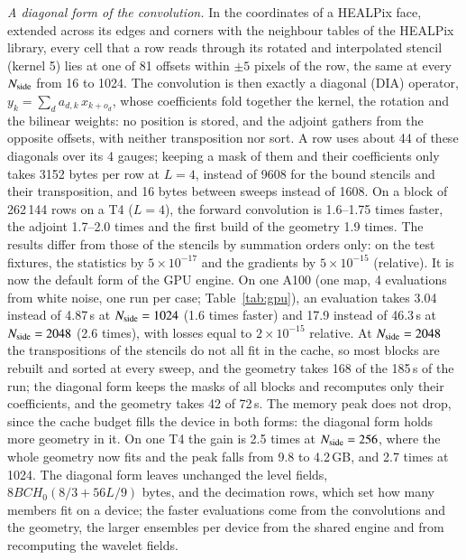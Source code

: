 \documentclass{aa}
\newcommand{\nside}{N_{\rm side}}
\begin{document}
\emph{A diagonal form of the convolution.} In the coordinates of a HEALPix face, extended across its edges and corners with the neighbour tables of the HEALPix library, every cell that a row reads through its rotated and interpolated stencil (kernel 5) lies at one of 81 offsets within $\pm5$ pixels of the row, the same at every $\nside$ from 16 to 1024. The convolution is then exactly a diagonal (DIA) operator, $y_k=\sum_d a_{d,k}\,x_{k+o_d}$, whose coefficients fold together the kernel, the rotation and the bilinear weights: no position is stored, and the adjoint gathers from the opposite offsets, with neither transposition nor sort. A row uses about 44 of these diagonals over its 4 gauges; keeping a mask of them and their coefficients only takes 3152 bytes per row at $L=4$, instead of 9608 for the bound stencils and their transposition, and 16 bytes between sweeps instead of 1608. On a block of 262\,144 rows on a T4 ($L=4$), the forward convolution is 1.6--1.75 times faster, the adjoint 1.7--2.0 times and the first build of the geometry 1.9 times. The results differ from those of the stencils by summation orders only: on the test fixtures, the statistics by $5\times10^{-17}$ and the gradients by $5\times10^{-15}$ (relative). It is now the default form of the GPU engine. On one A100 (one map, 4 evaluations from white noise, one run per case; Table~\ref{tab:gpu}), an evaluation takes 3.04 instead of 4.87\,s at $\nside=1024$ (1.6 times faster) and 17.9 instead of 46.3\,s at $\nside=2048$ (2.6 times), with losses equal to $2\times10^{-15}$ relative. At $\nside=2048$ the transpositions of the stencils do not all fit in the cache, so most blocks are rebuilt and sorted at every sweep, and the geometry takes 168 of the 185\,s of the run; the diagonal form keeps the masks of all blocks and recomputes only their coefficients, and the geometry takes 42 of 72\,s. The memory peak does not drop, since the cache budget fills the device in both forms: the diagonal form holds more geometry in it. On one T4 the gain is 2.5 times at $\nside=256$, where the whole geometry now fits and the peak falls from 9.8 to 4.2\,GB, and 2.7 times at 1024. The diagonal form leaves unchanged the level fields, $8BCH_0(8/3+56L/9)$ bytes, and the decimation rows, which set how many members fit on a device; the faster evaluations come from the convolutions and the geometry, the larger ensembles per device from the shared engine and from recomputing the wavelet fields.
\end{document}
